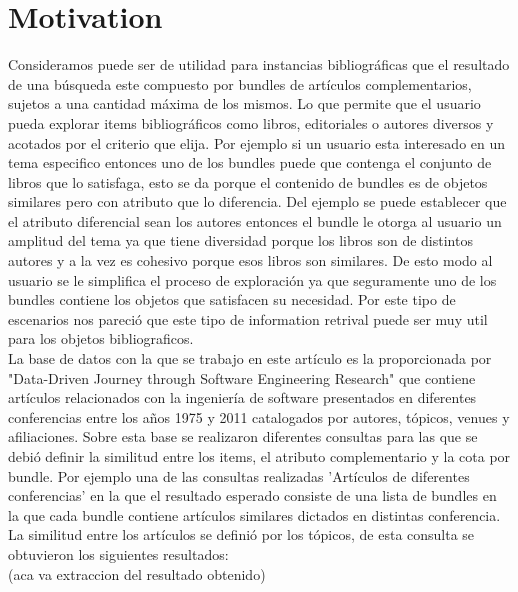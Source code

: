 \section{Motivation}
Consideramos puede ser de utilidad para instancias bibliográficas que el resultado de una búsqueda este compuesto por bundles de artículos complementarios, sujetos a una cantidad máxima de los mismos.
Lo que permite que el usuario pueda explorar items bibliográficos como libros, editoriales o autores diversos y acotados por el criterio que elija. Por ejemplo si un usuario esta interesado en un tema especifico entonces uno de los bundles puede que contenga el conjunto de libros que lo satisfaga, esto se da porque el contenido de bundles es de objetos similares pero con atributo que lo diferencia. Del ejemplo se puede establecer que el atributo diferencial sean los autores entonces el bundle le otorga al usuario un amplitud del tema ya que tiene diversidad porque los libros son de distintos autores y a la vez es cohesivo porque esos libros son similares. De esto modo al usuario se le simplifica el proceso de exploración ya que seguramente uno de los bundles contiene los objetos que satisfacen su necesidad. Por este tipo de escenarios nos pareció que este tipo de information retrival puede ser muy util para los objetos bibliograficos.   \\
La base de datos con la que se trabajo en este artículo es la proporcionada por "Data-Driven Journey through Software Engineering Research" que contiene artículos relacionados con la ingeniería de software presentados en diferentes conferencias entre los años 1975 y 2011 catalogados por autores, tópicos, venues y afiliaciones. Sobre esta base se realizaron diferentes consultas para las que se debió definir la similitud entre los items, el atributo complementario y la cota por bundle. Por ejemplo una de las consultas realizadas 'Artículos de diferentes conferencias'
en la que el resultado esperado consiste de una lista de bundles en la que cada bundle contiene artículos similares dictados en distintas conferencia. La similitud entre los artículos se definió por los tópicos, de esta consulta se obtuvieron los siguientes resultados:\\
(aca va extraccion del resultado obtenido)